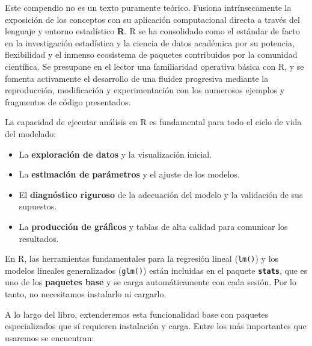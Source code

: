 \documentclass[
  letterpaper,
  DIV=11,
  numbers=noendperiod]{scrreprt}
\providecommand{\tightlist}{%
  \setlength{\itemsep}{0pt}\setlength{\parskip}{0pt}}
\begin{document}
\begin{tcolorbox}[enhanced jigsaw, breakable, toprule=.15mm, bottomtitle=1mm, coltitle=black, colbacktitle=quarto-callout-note-color!10!white, titlerule=0mm, opacitybacktitle=0.6, bottomrule=.15mm, toptitle=1mm, title=\textcolor{quarto-callout-note-color}{\faInfo}\hspace{0.5em}{R como lenguaje del modelado estadístico}, arc=.35mm, rightrule=.15mm, opacityback=0, colframe=quarto-callout-note-color-frame, leftrule=.75mm, left=2mm, colback=white]

Este compendio no es un texto puramente teórico. Fusiona intrínsecamente
la exposición de los conceptos con su aplicación computacional directa a
través del lenguaje y entorno estadístico \textbf{R}. R se ha
consolidado como el estándar de facto en la investigación estadística y
la ciencia de datos académica por su potencia, flexibilidad y el inmenso
ecosistema de paquetes contribuidos por la comunidad científica. Se
presupone en el lector una familiaridad operativa básica con R, y se
fomenta activamente el desarrollo de una fluidez progresiva mediante la
reproducción, modificación y experimentación con los numerosos ejemplos
y fragmentos de código presentados.

La capacidad de ejecutar análisis en R es fundamental para todo el ciclo
de vida del modelado:

\begin{itemize}
\tightlist
\item
  La \textbf{exploración de datos} y la visualización inicial.
\item
  La \textbf{estimación de parámetros} y el ajuste de los modelos.
\item
  El \textbf{diagnóstico riguroso} de la adecuación del modelo y la
  validación de sus supuestos.
\item
  La \textbf{producción de gráficos} y tablas de alta calidad para
  comunicar los resultados.
\end{itemize}

En R, las herramientas fundamentales para la regresión lineal
(\texttt{lm()}) y los modelos lineales generalizados (\texttt{glm()})
están incluidas en el paquete \textbf{\texttt{stats}}, que es uno de los
\textbf{paquetes base} y se carga automáticamente con cada sesión. Por
lo tanto, no necesitamos instalarlo ni cargarlo.

A lo largo del libro, extenderemos esta funcionalidad base con paquetes
especializados que sí requieren instalación y carga. Entre los más
importantes que usaremos se encuentran:


\end{tcolorbox}
\end{document}
